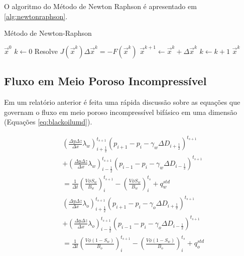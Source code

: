 \documentclass[final,5p]{elsarticle}
\numberwithin{equation}{section}
\begin{document}
        O algoritmo do Método de Newton Raphson é apresentado em \ref{alg:newtonraphson}.

        \begin{algorithm}
            \caption{Método de Newton-Raphson}\label{alg:newtonraphson}
            \begin{algorithmic}
                \Require $\vec{x}^0$
                \State $k \gets 0$
                \Repeat
                    \State Resolve $J(\vec{x}^k) \Delta \vec{x}^{k} = -F(\vec{x}^k)$
                    \State $\vec{x}^{k+1} \gets \vec{x}^{k} + \Delta \vec{x}^{k}$
                    \State $k \gets k+1$
                \State \Return $\vec{x}^{k}$
            \end{algorithmic}
        \end{algorithm}

    \subsection{Fluxo em Meio Poroso Incompressível}

        Em um relatório anterior\cite{relatoriogauss} é feita uma rápida discussão sobre as equações que governam o fluxo em meio poroso incompressível bifásico em uma dimensão (Equações \ref{eq:blackoilumd}).

        \begin{subequations}
        \begin{align}
            &\left( \frac{\Delta y \Delta z}{\Delta x} \lambda_w \right)_{i+\tfrac{1}{2}}^{t_{s+1}} (p_{i+1} - p_{i} - \gamma_w \Delta D_{i+\tfrac{1}{2}})^{t_{s+1}}  \nonumber \\
            &+ \left( \frac{\Delta y \Delta z}{\Delta x} \lambda_w \right)_{i-\tfrac{1}{2}}^{t_{s+1}} (p_{i-1} - p_{i} - \gamma_w \Delta D_{i-\tfrac{1}{2}})^{t_{s+1}} \nonumber \\
            &  = \frac{1}{\Delta t} \left(\frac{V \phi S_w}{B_w}\right)_i^{t_{s+1}} - \left(\frac{V \phi S_w}{B_w}\right)_i^{t_s} + q^{std}_w \label{eq:blackoilumdw} \\
            &\left( \frac{\Delta y \Delta z}{\Delta x} \lambda_o \right)_{i+\tfrac{1}{2}}^{t_{s+1}} (p_{i+1} - p_{i} - \gamma_o \Delta D_{i+\tfrac{1}{2}}) ^{t_{s+1}} \nonumber \\
            &+ \left( \frac{\Delta y \Delta z}{\Delta x} \lambda_o \right)_{i-\tfrac{1}{2}}^{t_{s+1}} (p_{i-1} - p_{i} - \gamma_o \Delta D_{i-\tfrac{1}{2}})^{t_{s+1}}\nonumber \\
            &  = \frac{1}{\Delta t} \left(\frac{V \phi (1-S_w)}{B_o}\right)_i^{t_{s+1}} - \left(\frac{V \phi (1-S_w)}{B_o}\right)_i^{t_s} + q^{std}_o \label{eq:blackoilumdo}
        \end{align}
        \label{eq:blackoilumd}
        \end{subequations}
\end{document}
